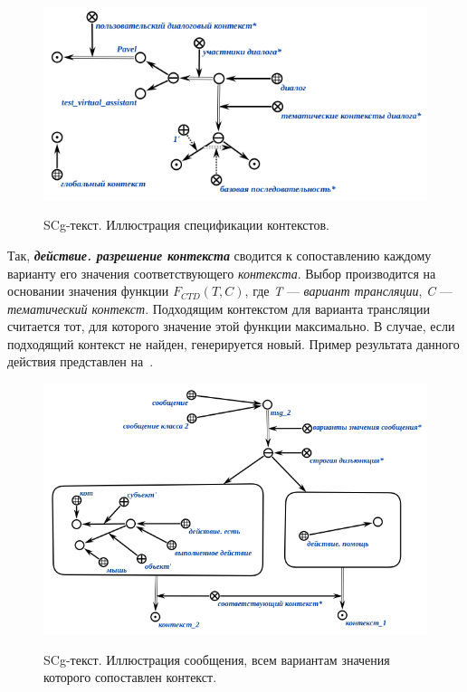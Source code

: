 \begin{figure}[H]
    \caption{SCg-текст. Иллюстрация спецификации контекстов.}
    \includegraphics[scale=0.8]{images/part4/chapter_nl_interfaces/user_context}
    \label{fig:user_context}
\end{figure}

Так, \textbf{\textit{действие. разрешение контекста}} сводится к сопоставлению каждому варианту его значения соответствующего \textit{контекста}.
Выбор производится на основании значения функции \textit{$F_{CTD}(T, C)$}, где \textit{T} --- \textit{вариант трансляции}, \textit{C} --- \textit{тематический контекст}.
Подходящим контекстом для варианта трансляции считается тот, для которого значение этой функции максимально.
В случае, если подходящий контекст не найден, генерируется новый.
Пример результата данного действия представлен на~\textit{}.

\begin{figure}[H]
    \caption{SCg-текст. Иллюстрация сообщения, всем вариантам значения которого сопоставлен контекст.}
    \includegraphics[scale=0.8]{images/part4/chapter_nl_interfaces/relevant_contexts}
    \label{fig:relevant_contexts}
\end{figure}

